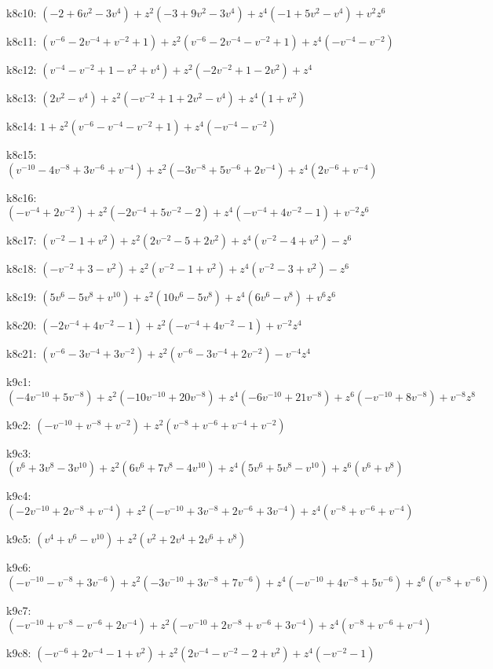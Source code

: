k8c10: $ (-2+6v^{2}-3v^{4})  +z^{2}(-3+9v^{2}-3v^{4})  +z^{4}(-1+5v^{2}-v^{4})  +v^{2}z^{6} $ 

k8c11: $ (v^{-6}-2v^{-4}+v^{-2}+1)  +z^{2}(v^{-6}-2v^{-4}-v^{-2}+1)  +z^{4}(-v^{-4}-v^{-2}) $ 

k8c12: $ (v^{-4}-v^{-2}+1-v^{2}+v^{4})  +z^{2}(-2v^{-2}+1-2v^{2})  +z^{4} $ 

k8c13: $ (2v^{2}-v^{4})  +z^{2}(-v^{-2}+1+2v^{2}-v^{4})  +z^{4}(1+v^{2}) $ 

k8c14: $ 1  +z^{2}(v^{-6}-v^{-4}-v^{-2}+1)  +z^{4}(-v^{-4}-v^{-2}) $ 

k8c15: $ (v^{-10}-4v^{-8}+3v^{-6}+v^{-4})  +z^{2}(-3v^{-8}+5v^{-6}+2v^{-4})  +z^{4}(2v^{-6}+v^{-4}) $ 

k8c16: $ (-v^{-4}+2v^{-2})  +z^{2}(-2v^{-4}+5v^{-2}-2)  +z^{4}(-v^{-4}+4v^{-2}-1)  +v^{-2}z^{6} $ 

k8c17: $ (v^{-2}-1+v^{2})  +z^{2}(2v^{-2}-5+2v^{2})  +z^{4}(v^{-2}-4+v^{2})  -z^{6} $ 

k8c18: $ (-v^{-2}+3-v^{2})  +z^{2}(v^{-2}-1+v^{2})  +z^{4}(v^{-2}-3+v^{2})  -z^{6} $ 

k8c19: $ (5v^{6}-5v^{8}+v^{10})  +z^{2}(10v^{6}-5v^{8})  +z^{4}(6v^{6}-v^{8})  +v^{6}z^{6} $ 

k8c20: $ (-2v^{-4}+4v^{-2}-1)  +z^{2}(-v^{-4}+4v^{-2}-1)  +v^{-2}z^{4} $ 

k8c21: $ (v^{-6}-3v^{-4}+3v^{-2})  +z^{2}(v^{-6}-3v^{-4}+2v^{-2})  -v^{-4}z^{4} $ 

k9c1: $ (-4v^{-10}+5v^{-8})  +z^{2}(-10v^{-10}+20v^{-8})  +z^{4}(-6v^{-10}+21v^{-8})  +z^{6}(-v^{-10}+8v^{-8})  +v^{-8}z^{8} $ 

k9c2: $ (-v^{-10}+v^{-8}+v^{-2})  +z^{2}(v^{-8}+v^{-6}+v^{-4}+v^{-2}) $ 

k9c3: $ (v^{6}+3v^{8}-3v^{10})  +z^{2}(6v^{6}+7v^{8}-4v^{10})  +z^{4}(5v^{6}+5v^{8}-v^{10})  +z^{6}(v^{6}+v^{8}) $ 

k9c4: $ (-2v^{-10}+2v^{-8}+v^{-4})  +z^{2}(-v^{-10}+3v^{-8}+2v^{-6}+3v^{-4})  +z^{4}(v^{-8}+v^{-6}+v^{-4}) $ 

k9c5: $ (v^{4}+v^{6}-v^{10})  +z^{2}(v^{2}+2v^{4}+2v^{6}+v^{8}) $ 

k9c6: $ (-v^{-10}-v^{-8}+3v^{-6})  +z^{2}(-3v^{-10}+3v^{-8}+7v^{-6})  +z^{4}(-v^{-10}+4v^{-8}+5v^{-6})  +z^{6}(v^{-8}+v^{-6}) $ 

k9c7: $ (-v^{-10}+v^{-8}-v^{-6}+2v^{-4})  +z^{2}(-v^{-10}+2v^{-8}+v^{-6}+3v^{-4})  +z^{4}(v^{-8}+v^{-6}+v^{-4}) $ 

k9c8: $ (-v^{-6}+2v^{-4}-1+v^{2})  +z^{2}(2v^{-4}-v^{-2}-2+v^{2})  +z^{4}(-v^{-2}-1) $ 

